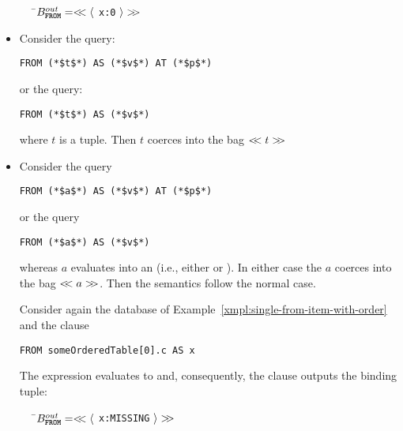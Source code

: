 \begin{itemize}
\begin{example}
\begin{tabbing}
\ \ \ \=$B^{out}_{\texttt{\textbf{FROM}}} = <\!\!<
        \langle$ \lstinline|x:0| $\rangle >\!\!>$\\
\end{tabbing}
\end{example}

\item {} Consider the query:

\begin{lstlisting}
FROM (*$t$*) AS (*$v$*) AT (*$p$*)
\end{lstlisting}

\noindent or the query:

\begin{lstlisting}
FROM (*$t$*) AS (*$v$*)
\end{lstlisting}
 
\noindent where $t$ is a tuple. Then $t$ coerces into the bag $<\!\!< t >\!\!>$

\item {} Consider the query

\begin{lstlisting}
FROM (*$a$*) AS (*$v$*) AT (*$p$*)
\end{lstlisting}

\noindent or the query

\begin{lstlisting}
FROM (*$a$*) AS (*$v$*)
\end{lstlisting}

\noindent whereas $a$ evaluates into an  (i.e., either
\MISSING or \NULL). In either case the  $a$ coerces
into the bag $<\!\!< a >\!\!>$. Then the semantics follow the normal case.

\begin{example}
Consider again the database of Example~\ref{xmpl:single-from-item-with-order}
and the \from clause 

\begin{lstlisting}
FROM someOrderedTable[0].c AS x
\end{lstlisting}

The expression  evaluates to \MISSING and,
consequently, the \from clause outputs the binding tuple:

\begin{tabbing}
\ \ \ \=$B^{out}_{\texttt{\textbf{FROM}}} = <\!\!< \langle$ \lstinline|x:MISSING| $\rangle >\!\!>$\\
\end{tabbing}
\end{example}

\end{itemize}

